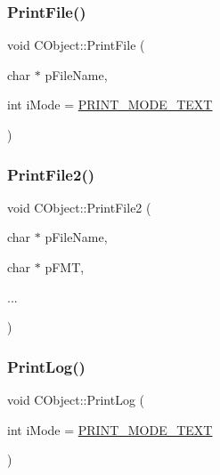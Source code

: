 \subsubsection{\texorpdfstring{PrintFile()}{PrintFile()}}
{\footnotesize\ttfamily void C\+Object\+::\+Print\+File (\begin{DoxyParamCaption}\item[{char $\ast$}]{p\+File\+Name,  }\item[{int}]{i\+Mode = {\ttfamily \mbox{\hyperlink{BoxRouter_8h_a57a837ae96ef88ba334045a535dd3b8e}{P\+R\+I\+N\+T\+\_\+\+M\+O\+D\+E\+\_\+\+T\+E\+XT}}} }\end{DoxyParamCaption})}

\mbox{\label{classCObject_a6894a565969879762f30ef73f70cbbc0}} 
\subsubsection{\texorpdfstring{PrintFile2()}{PrintFile2()}}
{\footnotesize\ttfamily void C\+Object\+::\+Print\+File2 (\begin{DoxyParamCaption}\item[{char $\ast$}]{p\+File\+Name,  }\item[{char $\ast$}]{p\+F\+MT,  }\item[{}]{... }\end{DoxyParamCaption})\hspace{0.3cm}{\ttfamily [static]}}

\mbox{\label{classCObject_aa98c9f97492a83c6397a7d8f98c63bba}} 
\subsubsection{\texorpdfstring{PrintLog()}{PrintLog()}}
{\footnotesize\ttfamily void C\+Object\+::\+Print\+Log (\begin{DoxyParamCaption}\item[{int}]{i\+Mode = {\ttfamily \mbox{\hyperlink{BoxRouter_8h_a57a837ae96ef88ba334045a535dd3b8e}{P\+R\+I\+N\+T\+\_\+\+M\+O\+D\+E\+\_\+\+T\+E\+XT}}} }\end{DoxyParamCaption})}

\mbox{\label{classCObject_afbef6034e527bf408a93e1ee2d0675e0}} 
